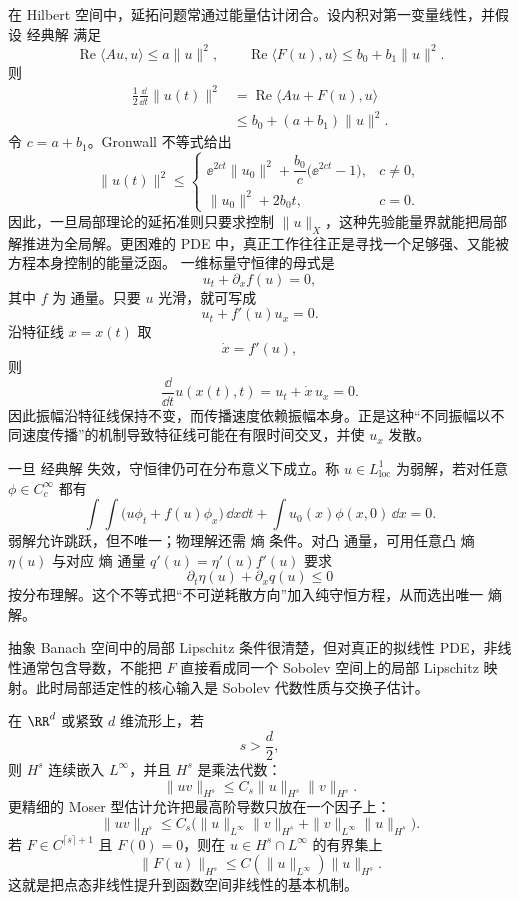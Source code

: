 在 Hilbert 空间中，延拓问题常通过能量估计闭合。设内积对第一变量线性，并假设 经典解 满足
\[
\operatorname{Re}\langle Au,u\rangle
\le a\|u\|^2,
\qquad
\operatorname{Re}\langle F(u),u\rangle
\le b_0+b_1\|u\|^2.
\]
则
\[
\begin{aligned}
\frac12\frac{\dd}{\dd t}\|u(t)\|^2
&=\operatorname{Re}\langle Au+F(u),u\rangle\\
&\le b_0+(a+b_1)\|u\|^2.
\end{aligned}
\]
令 $c=a+b_1$。Gronwall 不等式给出
\begin{equation*}\|u(t)\|^2
\le
\begin{cases}
\ee^{2ct}\|u_0\|^2+
\dfrac{b_0}{c}\bigl(\ee^{2ct}-1\bigr),&c\ne0,\\[8pt]
\|u_0\|^2+2b_0t,&c=0.
\end{cases}\end{equation*}
因此，一旦局部理论的延拓准则只要求控制 $\|u\|_X$，这种先验能量界就能把局部解推进为全局解。更困难的 PDE 中，真正工作往往正是寻找一个足够强、又能被方程本身控制的能量泛函。
一维标量守恒律的母式是
\begin{equation*}u_t+\partial_x f(u)=0,\end{equation*}
其中 $f$ 为 通量。只要 $u$ 光滑，就可写成
\[
u_t+f'(u)u_x=0.
\]
沿特征线 $x=x(t)$ 取
\[
\dot x=f'(u),
\]
则
\[
\frac{\dd}{\dd t}u(x(t),t)
=u_t+\dot x\,u_x=0.
\]
因此振幅沿特征线保持不变，而传播速度依赖振幅本身。正是这种“不同振幅以不同速度传播”的机制导致特征线可能在有限时间交叉，并使 $u_x$ 发散。

一旦 经典解 失效，守恒律仍可在分布意义下成立。称 $u\in L^1_{\mathrm{loc}}$ 为弱解，若对任意 $\phi\in C_c^\infty$ 都有
\[
\int\!\!\int
\bigl(u\phi_t+f(u)\phi_x\bigr)\,\dd x\dd t
+
\int u_0(x)\phi(x,0)\,\dd x
=0.
\]
弱解允许跳跃，但不唯一；物理解还需 熵 条件。对凸 通量，可用任意凸 熵 $\eta(u)$ 与对应 熵 通量 $q'(u)=\eta'(u)f'(u)$ 要求
\begin{equation*}\partial_t\eta(u)+\partial_xq(u)\le0\end{equation*}
按分布理解。这个不等式把“不可逆耗散方向”加入纯守恒方程，从而选出唯一 熵解。

抽象 Banach 空间中的局部 Lipschitz 条件很清楚，但对真正的拟线性 PDE，非线性通常包含导数，不能把 $F$ 直接看成同一个 Sobolev 空间上的局部 Lipschitz 映射。此时局部适定性的核心输入是 Sobolev 代数性质与交换子估计。

在 $\RR^d$ 或紧致 $d$ 维流形上，若
\[
s>\frac d2,
\]
则 $H^s$ 连续嵌入 $L^\infty$，并且 $H^s$ 是乘法代数：
\begin{equation*}{
\|uv\|_{H^s}
\le C_s\|u\|_{H^s}\|v\|_{H^s}
}.\end{equation*}
更精细的 Moser 型估计允许把最高阶导数只放在一个因子上：
\[
\|uv\|_{H^s}
\le C_s\bigl(
\|u\|_{L^\infty}\|v\|_{H^s}
+\|v\|_{L^\infty}\|u\|_{H^s}
\bigr).
\]
若 $F\in C^{\lceil s\rceil+1}$ 且 $F(0)=0$，则在 $u\in H^s\cap L^\infty$ 的有界集上
\[
\|F(u)\|_{H^s}
\le C(\|u\|_{L^\infty})\|u\|_{H^s}.
\]
这就是把点态非线性提升到函数空间非线性的基本机制。

